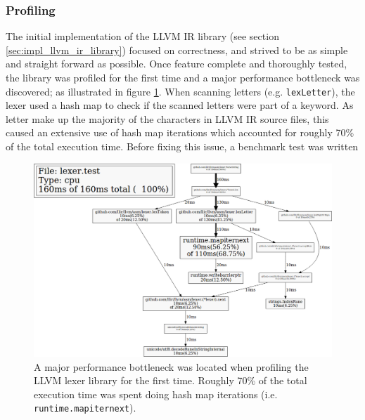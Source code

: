 
\subsubsection{Profiling}
\label{sec:ver_profiling}


The initial implementation of the LLVM IR library (see section \ref{sec:impl_llvm_ir_library}) focused on correctness, and strived to be as simple and straight forward as possible. Once feature complete and thoroughly tested, the library was profiled for the first time and a major performance bottleneck was discovered; as illustrated in figure \ref{fig:lexer_pprof}. When scanning letters (e.g. \texttt{lexLetter}), the lexer used a hash map to check if the scanned letters were part of a keyword. As letter make up the majority of the characters in LLVM IR source files, this caused an extensive use of hash map iterations which accounted for roughly 70\% of the total execution time. Before fixing this issue, a benchmark test was written

\begin{figure}[htbp]
	\begin{center}
		\includegraphics[width=\textwidth]{inc/8_ver/lexer_pprof.png}
		\caption{A major performance bottleneck was located when profiling the LLVM lexer library for the first time. Roughly 70\% of the total execution time was spent doing hash map iterations (i.e. \texttt{runtime.mapiternext}).}
		\label{fig:lexer_pprof}
	\end{center}
\end{figure}
